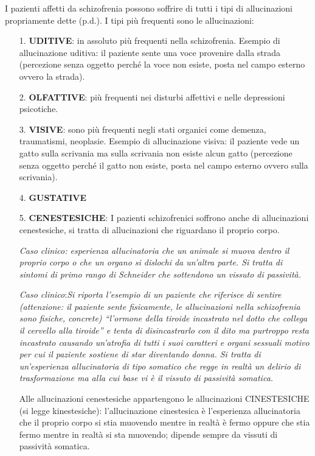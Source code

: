 \begin{itemize}
\begin{itemize}
I pazienti affetti da schizofrenia possono soffrire di tutti i tipi di
allucinazioni propriamente dette (p.d.). I tipi più frequenti sono le
allucinazioni:


\begin{itemize}
\item[1.]
  \textbf{UDITIVE}: in assoluto più frequenti nella schizofrenia.
  Esempio di allucinazione uditiva: il paziente sente una voce provenire
  dalla strada (percezione senza oggetto perché la voce non esiste,
  posta nel campo esterno ovvero la strada).
\item[2.]
  \textbf{OLFATTIVE}: più frequenti nei disturbi affettivi e nelle
  depressioni psicotiche.
\item[3.]
  \textbf{VISIVE}: sono più frequenti negli stati organici come demenza,
  traumatismi, neoplasie. Esempio di allucinazione visiva: il paziente
  vede un gatto sulla scrivania ma sulla scrivania non esiste alcun
  gatto (percezione senza oggetto perché il gatto non esiste, posta nel
  campo esterno ovvero sulla scrivania).
\item[4.]
  \textbf{GUSTATIVE}
\item[5.]
  \textbf{CENESTESICHE}: I pazienti schizofrenici soffrono anche di
  allucinazioni cenestesiche, si tratta di allucinazioni che riguardano
  il proprio corpo.

\emph{Caso clinico: esperienza allucinatoria che un animale si muova
dentro il proprio corpo o che un organo si dislochi da un'altra parte.
Si tratta di sintomi di primo rango di Schneider che sottendono un
vissuto di passività.}

\emph{Caso clinico}:\emph{Si riporta l'esempio di un paziente che
riferisce di sentire (attenzione: il paziente sente fisicamente, le
allucinazioni nella schizofrenia sono fisiche, concrete) ``l'ormone
della tiroide incastrato nel dotto che collega il cervello alla
tiroide'' e tenta di disincastrarlo con il dito ma purtroppo resta
incastrato causando un'atrofia di tutti i suoi caratteri e organi
sessuali motivo per cui il paziente sostiene di star diventando donna.
Si tratta di un'esperienza allucinatoria di tipo somatico che regge in
realtà un delirio di trasformazione ma alla cui base vi è il vissuto di
passività somatica. }

Alle allucinazioni cenestesiche appartengono le allucinazioni
CINESTESICHE (si legge kinestesiche): l'allucinazione cinestesica è
l'esperienza allucinatoria che il proprio corpo si stia muovendo mentre
in realtà è fermo oppure che stia fermo mentre in realtà si sta
muovendo; dipende sempre da vissuti di passività somatica.


\end{itemize}
\end{itemize}
\end{itemize}
